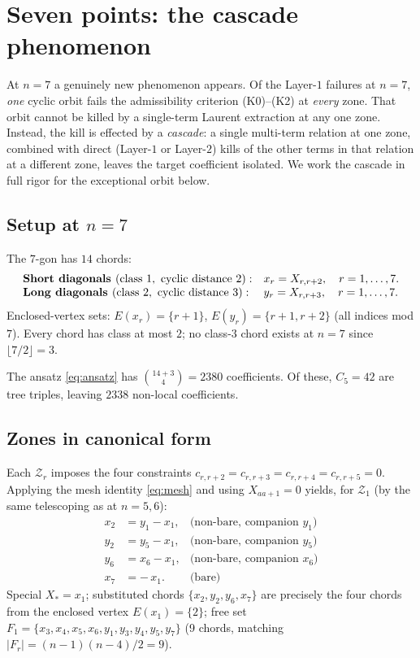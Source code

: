 \documentclass[11pt]{article}
\newcommand{\Zr}{\mathcal{Z}}
\newcommand{\Fr}{F}
\begin{document}
\section{Seven points: the cascade phenomenon}\label{sec:n7}

At $n = 7$ a genuinely new phenomenon appears. Of the Layer-$1$ failures
at $n=7$, \emph{one} cyclic orbit fails the admissibility criterion
(K0)--(K2) at \emph{every} zone. That orbit cannot be killed by a
single-term Laurent extraction at any one zone. Instead, the kill is
effected by a \emph{cascade}: a single multi-term relation at one zone,
combined with direct (Layer-$1$ or Layer-$2$) kills of the other terms
in that relation at a different zone, leaves the target coefficient
isolated. We work the cascade in full rigor for the exceptional orbit
below.

\subsection{Setup at $n=7$}

The $7$-gon has $14$ chords:
\[
\begin{array}{ll}
\text{\bf Short diagonals } (\text{class } 1,\ \text{cyclic distance } 2): &
  x_r = X_{r, r+2},\quad r = 1, \ldots, 7. \\
\text{\bf Long diagonals } (\text{class } 2,\ \text{cyclic distance } 3): &
  y_r = X_{r, r+3},\quad r = 1, \ldots, 7.
\end{array}
\]
Enclosed-vertex sets: $E(x_r) = \{r+1\}$, $E(y_r) = \{r+1, r+2\}$
(all indices mod $7$). Every chord has class at most $2$; no class-$3$
chord exists at $n=7$ since $\lfloor 7/2 \rfloor = 3$.

The ansatz \eqref{eq:ansatz} has
$\binom{14+3}{4} = 2380$ coefficients. Of these, $C_5 = 42$ are tree
triples, leaving $2338$ non-local coefficients.

\subsection{Zones in canonical form}

Each $\Zr_r$ imposes the four constraints
$c_{r,r+2} = c_{r,r+3} = c_{r,r+4} = c_{r,r+5} = 0$.
Applying the mesh identity \eqref{eq:mesh} and using $X_{aa+1} = 0$
yields, for $\Zr_1$ (by the same telescoping as at $n=5,6$):
\begin{align*}
x_2 &= y_1 - x_1, &\text{(non-bare, companion } y_1) \\
y_2 &= y_5 - x_1, &\text{(non-bare, companion } y_5) \\
y_6 &= x_6 - x_1, &\text{(non-bare, companion } x_6) \\
x_7 &= -\,x_1. &\text{(bare)}
\end{align*}
Special $X_\ast = x_1$; substituted chords $\{x_2, y_2, y_6, x_7\}$ are
precisely the four chords from the enclosed vertex $E(x_1) = \{2\}$;
free set
$\Fr_1 = \{x_3, x_4, x_5, x_6, y_1, y_3, y_4, y_5, y_7\}$ (9 chords,
matching $|\Fr_r| = (n-1)(n-4)/2 = 9$).
\end{document}
